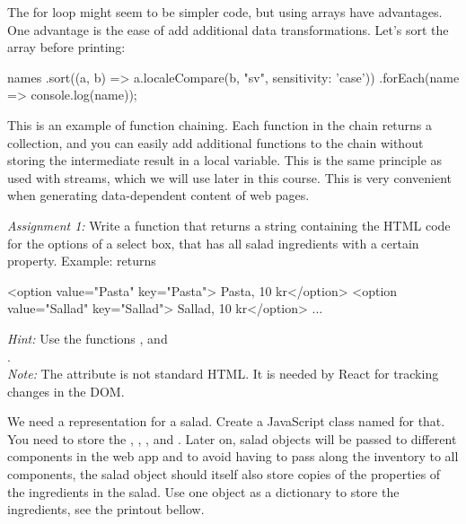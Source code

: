 \documentclass[fleqn, article, a4paper]{memoir}
\begin{document}
\begin{Assignments}
The for loop might seem to be simpler code, but using arrays have advantages. One advantage is the ease of add additional data transformations. Let's sort the array before printing:
\begin{Code}
names
.sort((a, b) => a.localeCompare(b, "sv", {sensitivity: 'case'}))
.forEach(name => console.log(name));
\end{Code}
This is an example of function chaining. Each function in the chain returns a collection, and you can easily add additional functions to the chain without storing the intermediate result in a local variable. This is the same principle as used with streams, which we will use later in this course. This is very convenient when generating data-dependent content of web pages.

\emph{Assignment 1:} Write a function that returns a string containing the HTML code for the options of a select box, that has all salad ingredients with a certain property. Example:
 returns 
\begin{Code}
<option value="Pasta" key="Pasta"> Pasta, 10 kr</option>
<option value="Sallad" key="Sallad"> Sallad, 10 kr</option> ...
\end{Code}
\emph{Hint:} Use the functions ,  and \\.
\\ \emph{Note:} The  attribute is not standard HTML. It is needed by React for tracking changes in the DOM.

\item We need a representation for a salad. Create a JavaScript class named  for that. You need to store the , , , and . Later on, salad objects will be passed to different components in the web app and to avoid having to pass along the inventory to all components, the salad object should itself also store copies of the properties of the ingredients in the salad. Use one object as a dictionary to store the ingredients, see the printout bellow.


\end{Assignments}
\end{document}
